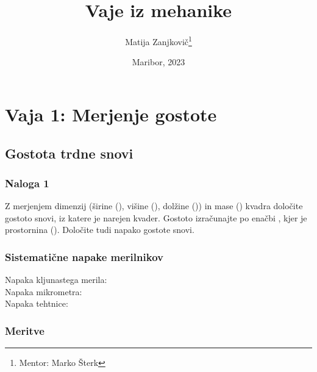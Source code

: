 \documentclass{report}
\title{Vaje iz mehanike}
\author{Matija Zanjkovič\thanks{Mentor: Marko Šterk}}
\date{Maribor, 2023}
\begin{document}
\maketitle
\thispagestyle{empty}

\null\newpage

\thispagestyle{empty}
\tableofcontents

\listoftables

\listoffigures

\thispagestyle{empty}

\clearpage  %



\setcounter{page}{1}  %

\chapter{Vaja 1: Merjenje gostote}
\section{Gostota trdne snovi}
\subsection{Naloga 1}
Z merjenjem dimenzij (širine (), višine (), dolžine ()) in mase () kvadra določite gostoto \bm{(\rho)} snovi, iz katere je narejen kvader. 
Gostoto izračunajte po enačbi , kjer je  prostornina (). Določite tudi napako gostote snovi.
\subsection{Sistematične napake merilnikov}
Napaka kljunastega merila: \\
Napaka mikrometra: \\
Napaka tehtnice: \\

\subsection{Meritve}
\end{document}

